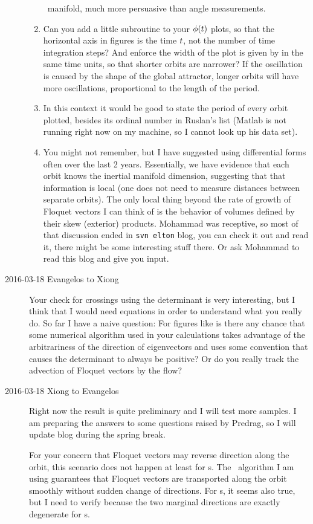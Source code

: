\begin{description}
\begin{enumerate}
\entangled\ manifold, much more persuasive than angle measurements.
  \item
Can you add a little subroutine to your $\phi(t)$ plots, so that the
horizontal axis in figures is the time $t$, not the number of time
integration steps? And enforce the width of the plot is given by
 in the same time units, so that shorter orbits are narrower?
If the oscillation is caused by the shape of the global attractor, longer
orbits will have more oscillations, proportional to the length of the
period.
  \item
In this context it would be good to state the period  of every
orbit plotted, besides its ordinal number in Ruslan's list (Matlab is not
running right now on my machine, so I cannot look up his data set).
  \item
You might not remember, but I have suggested using differential forms
often over the last 2 years. Essentially, we have evidence that each
orbit knows the inertial manifold dimension, suggesting that that
information is local (one does not need to measure distances between
separate orbits). The only local thing beyond the rate of growth of
Floquet vectors I can think of is the behavior of volumes defined by
their skew (exterior) products. Mohammad was receptive, so most of that
discussion ended in \texttt{svn elton} blog, you can check it out and
read it, there might be some interesting stuff there. Or ask Mohammad to
read this blog and give you input.

\end{enumerate}

\item[2016-03-18 Evangelos to Xiong] Your check for crossings using
the determinant is very interesting, but I think that I would need
equations in order to understand what you really do. So far I have
a naive question: For figures like  is there
any chance that some numerical algorithm used in your calculations
takes advantage of the arbitrariness of the direction of eigenvectors
and uses some convention that causes the determinant to always be
positive? Or do you really track the advection of Floquet vectors
by the flow?


\item[2016-03-18 Xiong to Evangelos]
Right now the result is quite preliminary and I will test more
samples. I am preparing the answers to some questions raised by
Predrag, so I will update blog during the spring break.

For your concern that Floquet vectors may reverse direction
along the orbit, this scenario does not happen at least for \ppo s. The
\ped\ algorithm I am using guarantees that Floquet vectors are
transported along the orbit smoothly without sudden change of directions.
For \rpo s, it seems also true, but I need to verify because the two
marginal directions are exactly degenerate for \rpo s.


\end{description}
